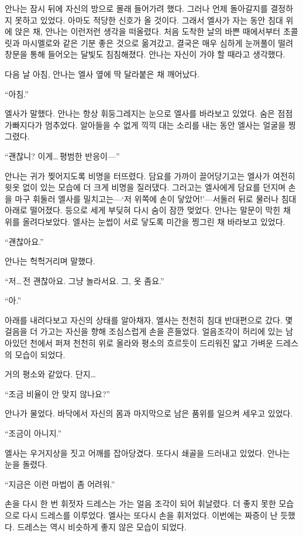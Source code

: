안나는 잠시 뒤에 자신의 방으로 몰래 들어가려 했다. 그러나 언제 돌아갈지를 결정하지 못하고 있었다. 아마도 적당한 신호가 올 것이다. 그래서 엘사가 자는 동안 침대 위에 앉은 채, 안나는 이런저런 생각을 떠올렸다. 처음 도착한 날의 바쁜 때에서부터 초콜릿과 마시멜로와 같은 기분 좋은 것으로 옮겨갔고, 결국은 매우 심하게 눈꺼풀이 떨려 창문을 통해 들어오는 달빛도 침침해졌다. 안나는 자신이 가야 할 때라고 생각했다.

다음 날 아침, 안나는 엘사 옆에 딱 달라붙은 채 깨어났다.

`` 아침.''

엘사가 말했다. 안나는 항상 휘둥그레지는 눈으로 엘사를 바라보고 있었다. 숨은 점점 가빠지다가 멈추었다. 알아들을 수 없게 끽끽 대는 소리를 내는 동안 엘사는 얼굴을 찡그렸다.

``괜찮니? 이게\ldots\,평범한 반응이—''

안나는 귀가 찢어지도록 비명을 터뜨렸다. 담요를 가까이 끌어당기고는 엘사가 여전히 윗옷 없이 있는 모습에 더 크게 비명을 질러댔다. 그러고는 엘사에게 담요를 던지며 손을 마구 휘둘러 엘사를 밀치고는—`저 위쪽에 손이 닿았어!'—서둘러 뒤로 물러나 침대 아래로 떨어졌다. 등으로 세게 부딪혀 다시 숨이 잠깐 멎었다. 안나는 말문이 막힌 채 위를 올려다보았다. 엘사는 눈썹이 서로 닿도록 미간을 찡그린 채 바라보고 있었다.

``괜찮아요.''

안나는 헉헉거리며 말했다.

``저\ldots\,전 괜찮아요. 그냥 놀라서요. 그, 옷 좀요.''

``아.''

아래를 내려다보고 자신의 상태를 알아채자, 엘사는 천천히 침대 반대편으로 갔다. 몇 걸음을 더 가고는 자신을 향해 조심스럽게 손을 흔들었다. 얼음조각이 허리에 있는 남아있던 천에서 퍼져 천천히 위로 올라와 평소의 흐르듯이 드리워진 얇고 가벼운 드레스의 모습이 되었다.

거의 평소와 같았다. 단지\ldots

``조금 비율이 안 맞지 않나요?''

안나가 물었다. 바닥에서 자신의 몸과 마지막으로 남은 품위를 일으켜 세우고 있었다.

``조금이 아니지.''

엘사는 우거지상을 짓고 어깨를 잡아당겼다. 또다시 쇄골을 드러내고 있었다. 안나는 눈을 돌렸다.

``지금은 이런 마법이 좀 어려워.''

손을 다시 한 번 휘젓자 드레스는 가는 얼음 조각이 되어 휘날렸다. 더 좋지 못한 모습으로 다시 드레스를 이루었다. 엘사는 또다시 손을 휘저었다. 이번에는 짜증이 난 듯했다. 드레스는 역시 비슷하게 좋지 않은 모습이 되었다.

